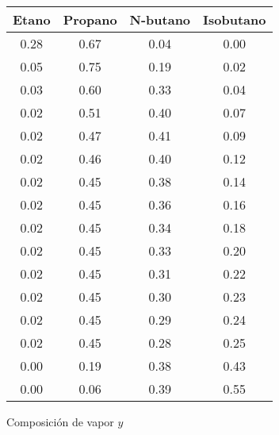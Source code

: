 \begin{figure}[H]
    \centering
    \caption{Composición de vapor $y$}
    \small
    \begin{tabular}{|c|c|c|c|}
        \hline
        \textbf{Etano} & \textbf{Propano} & \textbf{N-butano} & \textbf{Isobutano} \\
        \hline
        0.28           & 0.67             & 0.04              & 0.00               \\
        \hline
        0.05           & 0.75             & 0.19              & 0.02               \\
        \hline
        0.03           & 0.60             & 0.33              & 0.04               \\
        \hline
        0.02           & 0.51             & 0.40              & 0.07               \\
        \hline
        0.02           & 0.47             & 0.41              & 0.09               \\
        \hline
        0.02           & 0.46             & 0.40              & 0.12               \\
        \hline
        0.02           & 0.45             & 0.38              & 0.14               \\
        \hline
        0.02           & 0.45             & 0.36              & 0.16               \\
        \hline
        0.02           & 0.45             & 0.34              & 0.18               \\
        \hline
        0.02           & 0.45             & 0.33              & 0.20               \\
        \hline
        0.02           & 0.45             & 0.31              & 0.22               \\
        \hline
        0.02           & 0.45             & 0.30              & 0.23               \\
        \hline
        0.02           & 0.45             & 0.29              & 0.24               \\
        \hline
        0.02           & 0.45             & 0.28              & 0.25               \\
        \hline
        0.00           & 0.19             & 0.38              & 0.43               \\
        \hline
        0.00           & 0.06             & 0.39              & 0.55               \\
        \hline

\end{tabular}
\end{figure}
